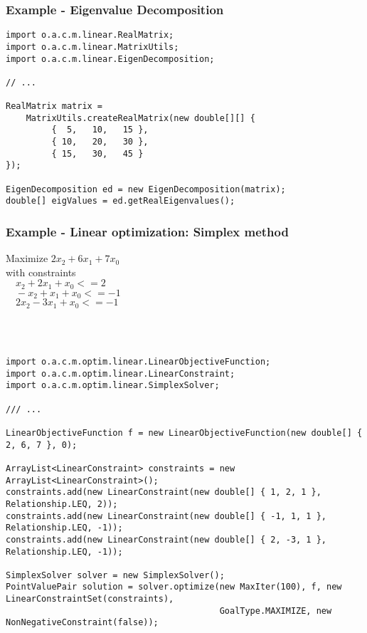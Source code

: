 \documentclass[10pt,mathserif]{beamer}
\begin{document}
\begin{frame}[fragile]
  \frametitle{Example - Eigenvalue Decomposition}

\begin{verbatim}
import o.a.c.m.linear.RealMatrix;
import o.a.c.m.linear.MatrixUtils;
import o.a.c.m.linear.EigenDecomposition;

// ...

RealMatrix matrix = 
    MatrixUtils.createRealMatrix(new double[][] {
         {  5,   10,   15 },
         { 10,   20,   30 },
         { 15,   30,   45 }
});

EigenDecomposition ed = new EigenDecomposition(matrix);
double[] eigValues = ed.getRealEigenvalues();
\end{verbatim}
\end{frame}


\begin{frame}[fragile]
  \frametitle{Example - Linear optimization: Simplex method}

\begin{small}
Maximize \(2x_2 + 6x_1 + 7x_0\) \\
with constraints \\
   \(\quad x_2 + 2x_1 + x_0 <= 2\) \\ 
   \(\quad -x_2 + x_1 + x_0 <= -1\) \\
   \(\quad 2x_2 - 3x_1 + x_0 <= -1\)
\end{small}

\\~\\

\begin{verbatim}
import o.a.c.m.optim.linear.LinearObjectiveFunction;
import o.a.c.m.optim.linear.LinearConstraint;
import o.a.c.m.optim.linear.SimplexSolver;

/// ...

LinearObjectiveFunction f = new LinearObjectiveFunction(new double[] { 2, 6, 7 }, 0);

ArrayList<LinearConstraint> constraints = new ArrayList<LinearConstraint>();
constraints.add(new LinearConstraint(new double[] { 1, 2, 1 }, Relationship.LEQ, 2));
constraints.add(new LinearConstraint(new double[] { -1, 1, 1 }, Relationship.LEQ, -1));
constraints.add(new LinearConstraint(new double[] { 2, -3, 1 }, Relationship.LEQ, -1));

SimplexSolver solver = new SimplexSolver();
PointValuePair solution = solver.optimize(new MaxIter(100), f, new LinearConstraintSet(constraints),
                                          GoalType.MAXIMIZE, new NonNegativeConstraint(false));
\end{verbatim}
\end{frame}
\end{document}
